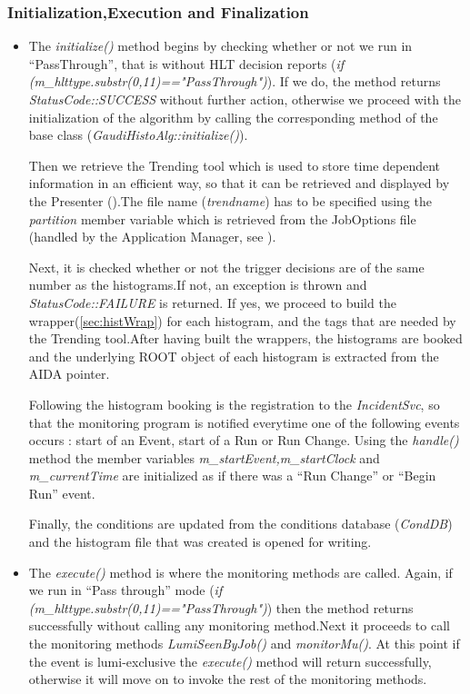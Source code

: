 \subsubsection{\textbf{Initialization,Execution and Finalization}}
\begin{itemize}
\item \label{sec:init1} The \textit{initialize()} method begins by checking whether or not we run in ``PassThrough'', that is without HLT decision reports (\textit{if (m\_hlttype.substr(0,11)=="PassThrough")}). If we do, the method returns \textit{StatusCode::SUCCESS} without further action, otherwise we proceed with the initialization of the algorithm by calling the corresponding method of the base class (\textit{GaudiHistoAlg::initialize()}).\par
Then we retrieve the Trending tool which is used to store time dependent information in an efficient way, so that it can be retrieved and displayed by the Presenter (\cite{trend}).The file name (\textit{trendname}) has to be specified using the \textit{partition} member variable which is retrieved from the JobOptions file (handled by the Application Manager, see \cite{mato1998gaudi}).\par
Next, it is checked whether or not the trigger decisions are of the same number as the histograms.If not, an exception is thrown and \textit{StatusCode::FAILURE} is returned. If yes, we proceed to build the wrapper(\ref{sec:histWrap}) for each histogram, and the tags that are needed by the Trending tool.After having built the wrappers, the histograms are booked and the underlying ROOT object of each histogram is extracted from the AIDA pointer.\par
Following the histogram booking is the registration to the \textit{IncidentSvc}, so that the monitoring program is notified everytime one of the following events occurs : start of an Event, start of a Run or Run Change. Using the \textit{handle()} method the member variables \textit{m\_startEvent,m\_startClock} and \textit{m\_currentTime} are initialized as if there was a ``Run Change'' or ``Begin Run'' event.\par
Finally, the conditions are updated from the conditions database (\textit{CondDB}) and the histogram file that was created is opened for writing.\par

\item The \textit{execute()}  method is where the monitoring methods are called. Again, if we run in ``Pass through'' mode (\textit{if (m\_hlttype.substr(0,11)=="PassThrough")}) then the method returns successfully without calling any monitoring method.Next it proceeds to call the monitoring methods \textit{LumiSeenByJob()} and \textit{monitorMu()}. At this point if the event is lumi-exclusive the \textit{execute()} method will return successfully, otherwise it will move on to invoke the rest of the monitoring methods.\par


\end{itemize}
